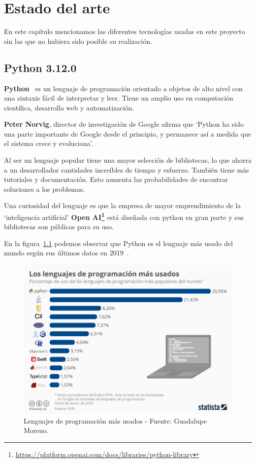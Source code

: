 \documentclass[a4paper, 12pt]{book}
\begin{document}
\cleardoublepage
\chapter{Estado del arte}
\label{chap:estado}
En este capítulo mencionamos las diferentes tecnologías  usadas en este proyecto sin las que no hubiera sido posible su realización.
 

\section{Python 3.12.0} 
\label{sec:python}
\textbf{Python}~\cite{oracle:_python} es un lenguaje de programación orientado a objetos de alto nivel con una sintaxis fácil de interpretar y leer. Tiene un amplio uso en computación científica, desarrollo web y automatización.

\textbf{Peter Norvig}, director de investigación de Google afirma que `Python ha sido una parte importante de Google desde el principio, y permanece así a medida que el sistema crece y evoluciona'.

Al ser un lenguaje popular tiene una mayor selección de bibliotecas, lo que ahorra a un desarrollador cantidades increíbles de tiempo y esfuerzo. También tiene más tutoriales y documentación. Esto aumenta las probabilidades de encontrar soluciones a los problemas.

Una curiosidad del lenguaje es que la empresa de mayor emprendimiento de la `inteligencia artificial'  \textbf{ Open AI\footnote{\url{https://platform.openai.com/docs/libraries/python-library}}} está diseñada con python en gran parte y sus bibliotecas son públicas para su uso.

En la figura~\ref{fig:evolucion_python} podemos observar que Python es el lenguaje más usado del mundo según sus últimos datos en 2019~\cite{statista:_tecnología}.

\begin{figure}
	\centering
	\includegraphics[width=14cm, keepaspectratio]{img/ev_python.jpeg}
	\caption{Lenguajes de programación más usados - Fuente: Guadalupe Moreno.}
	\label{fig:evolucion_python}
\end{figure}
\end{document}
